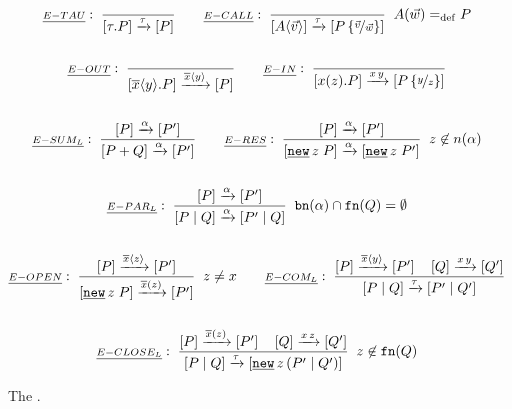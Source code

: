\begin{figure}[h!]
\begin{gather*}
\kalRule{E-TAU}{}{}{\ec{\tau.P} \transs{\tau} \ec{P}} \quad\quad \kalRule[\procdef{A}{\parl{w}}\define P]{E-CALL}{}{}{\ec{\proccall{A}{\parl{v}}} \tautrans \ec{P\subs{\parl{v}}{\parl{w}}}} \\\\
\kalRule{E-OUT}{}{}{\ec{\out{x}{y}.P} \transs{\out{x}{y}} \ec{P}} \quad\quad \kalRule{E-IN}{}{}{\ec{\inp{x}{z}.P} \intrans{x}{y} \ec{P\subs{y}{z}}} \\\\
\kalRule{E-SUM_L}{}{\ec{P} \transs{\alpha} \ec{P'}}{\ec{P+Q} \transs{\alpha} \ec{P'}} \quad\quad \kalRule[z\nin n(\alpha)]{E-RES}{}{\ec{P} \transs{\alpha} \ec{P'}}{\ec{\procres{z}{P}} \transs{\alpha} \ec{\procres{z}{P'}}} \\\\
\kalRule[\bn{\alpha}\cap\fn{Q}=\emptyset]{E-PAR_L}{}{\ec{P} \transs{\alpha} \ec{P'}}{\ec{\procpar{P}{Q}} \transs{\alpha} \ec{\procpar{P'}{Q}}} \\\\
\kalRule[z\neq x]{E-OPEN}{}{\ec{P} \outtrans{x}{z} \ec{P'}}{\ec{\procres{z}{P}} \bouttrans{x}{z} \ec{P'}} \quad\quad \kalRule{E-COM_L}{\ec{P} \outtrans{x}{y} \ec{P'}}{\ec{Q} \intrans{x}{y} \ec{Q'}}{\ec{\procpar{P}{Q}} \tautrans \ec{\procpar{P'}{Q'}}}\\\\
\kalRule[z\nin\fn{Q}]{E-CLOSE_L}{\ec{P} \bouttrans{x}{z} \ec{P'}}{\ec{Q} \intrans{x}{z} \ec{Q'}}{\ec{\procpar{P}{Q}} \tautrans \ec{\procres[a]{z}{\procpar{P'}{Q'}}}}
\end{gather*}
\caption{The  \cite{sangiorgi}.}
\label{fig_ts_early}
\end{figure}

